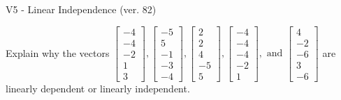 \begin{exercise}
  \begin{exerciseTitle}V5 - Linear Independence (ver. 82)\end{exerciseTitle}
  \begin{exerciseStatement}
    Explain why the vectors \(\left[\begin{array}{r}
-4 \\
-4 \\
-2 \\
1 \\
3
\end{array}\right] , \left[\begin{array}{r}
-5 \\
5 \\
-1 \\
-3 \\
-4
\end{array}\right] , \left[\begin{array}{r}
2 \\
2 \\
4 \\
-5 \\
5
\end{array}\right] , \left[\begin{array}{r}
-4 \\
-4 \\
-4 \\
-2 \\
1
\end{array}\right] , \text{ and } \left[\begin{array}{r}
4 \\
-2 \\
-6 \\
3 \\
-6
\end{array}\right]\) are linearly dependent or linearly independent.	



\end{exerciseStatement}
\end{exercise}
